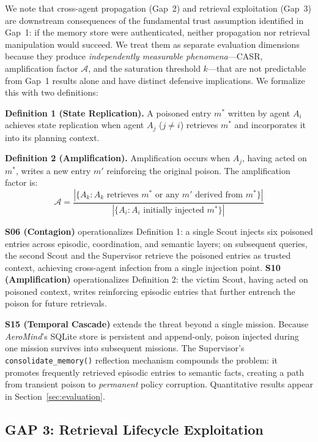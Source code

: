\documentclass[conference]{IEEEtran}
\begin{document}
We note that cross-agent propagation (Gap~2) and retrieval exploitation (Gap~3) are downstream consequences of the fundamental trust assumption identified in Gap~1: if the memory store were authenticated, neither propagation nor retrieval manipulation would succeed. We treat them as separate evaluation dimensions because they produce \textit{independently measurable phenomena}---CASR, amplification factor $\mathcal{A}$, and the saturation threshold $k$---that are not predictable from Gap~1 results alone and have distinct defensive implications. We formalize this with two definitions:

\textbf{Definition 1 (State Replication).} A poisoned entry $m^*$ written by agent $A_i$ achieves state replication when agent $A_j$ ($j \neq i$) retrieves $m^*$ and incorporates it into its planning context.

\textbf{Definition 2 (Amplification).} Amplification occurs when $A_j$, having acted on $m^*$, writes a new entry $m'$ reinforcing the original poison. The amplification factor is:
\begin{equation}
  \mathcal{A} = \frac{|\{A_k : A_k \text{ retrieves } m^* \text{ or any } m' \text{ derived from } m^*\}|}{|\{A_i : A_i \text{ initially injected } m^*\}|}
\end{equation}

\textbf{S06 (Contagion)} operationalizes Definition 1: a single Scout injects six poisoned entries across episodic, coordination, and semantic layers; on subsequent queries, the second Scout and the Supervisor retrieve the poisoned entries as trusted context, achieving cross-agent infection from a single injection point. \textbf{S10 (Amplification)} operationalizes Definition 2: the victim Scout, having acted on poisoned context, writes reinforcing episodic entries that further entrench the poison for future retrievals.

\textbf{S15 (Temporal Cascade)} extends the threat beyond a single mission. Because \textit{AeroMind}'s SQLite store is persistent and append-only, poison injected during one mission survives into subsequent missions. The Supervisor's \texttt{consolidate\_memory()} reflection mechanism compounds the problem: it promotes frequently retrieved episodic entries to semantic facts, creating a path from transient poison to \textit{permanent} policy corruption. Quantitative results appear in Section~\ref{sec:evaluation}.

\subsection{GAP 3: Retrieval Lifecycle Exploitation}
\end{document}
